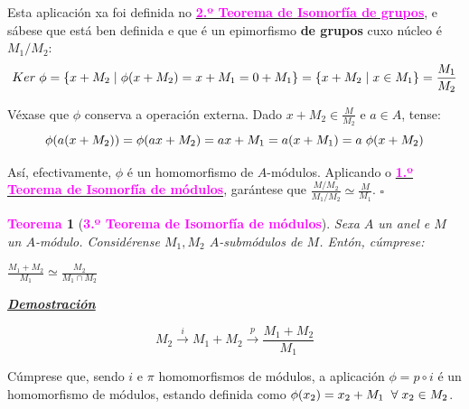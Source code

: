 \documentclass[twoside]{report}
\newcommand{\magbf}[1]{\textcolor{magenta}{\textbf{#1}}} %
\theoremstyle{mystyle}
\newtheorem{theo}{\magbf{Teorema}}[chapter]
\newenvironment{theorem}
{\begin{mdframed}[linecolor = magenta,backgroundcolor = classicrose, linewidth = 2mm]\begin{theo}}
{\end{theo}\end{mdframed}}
\begin{document}
\noindent Esta aplicación xa foi definida no \hyperref[th1.6]{\magbf{2.º Teorema de Isomorfía de grupos}}, e sábese que está ben definida e que é un epimorfismo \textbf{de grupos} cuxo núcleo é $M_{1}/M_{2}$:
$$Ker \hspace{1mm} \phi = \{x + M_{2} \hspace{1mm} | \hspace{1mm} \phi(x+ M_{2}) = x + M_{1} = 0 + M_{1} \} = \{x + M_{2} \hspace{1mm} | \hspace{1mm} x \in M_{1} \} = \displaystyle \frac{M_{1}}{M_{2}}$$

\noindent Véxase que $\phi$ conserva a operación externa. Dado $x + M_{2} \in \displaystyle \frac{M}{M_{2}}$ e $a \in A$, tense:
$$\phi(a(x + M_{2})) = \phi(ax + M_{2}) = ax + M_{1} = a(x + M_{1}) = a \hspace{1mm} \phi(x + M_{2})$$

\noindent Así, efectivamente, $\phi$ é un homomorfismo de $A$-módulos. Aplicando o \hyperref[th3.1]{\magbf{1.º Teorema de Isomorfía de módulos}}, garántese que $\displaystyle \frac{M/M_{2}}{M_{1}/M_{2}} \simeq \displaystyle \frac{M}{M_{1}}$. $\square$\\

\vspace{3mm}

\begin{theorem}[\magbf{3.º Teorema de Isomorfía de módulos}] \label{th3.3}
Sexa $A$ un anel e $M$ un $A$-módulo. Considérense $M_{1},M_{2}$ $A$-submódulos de $M$. Entón, cúmprese:
\begin{center}
    $\displaystyle \frac{M_{1} + M_{2}}{M_{1}} \simeq \displaystyle \frac{M_{2}}{M_{1}\cap M_{2}}$
\end{center}
\end{theorem}

\vspace{2mm}

\noindent \textbf{\textit{\underline{Demostración}}}

\vspace{2mm}

$$ M_{2} \overset{i}{\longrightarrow} M_{1} + M_{2} \overset{p}{\longrightarrow}\displaystyle \frac{M_{1} + M_{2}}{M_{1}}$$

\noindent Cúmprese que, sendo $i$ e $\pi$ homomorfismos de módulos, a aplicación $\phi = p \circ i$ é un homomorfismo de módulos, estando definida como $\phi(x_{2}) = x_{2} + M_{1} \hspace{2mm} \forall \hspace{1mm} x_{2} \in M_{2} $.\\
\end{document}
